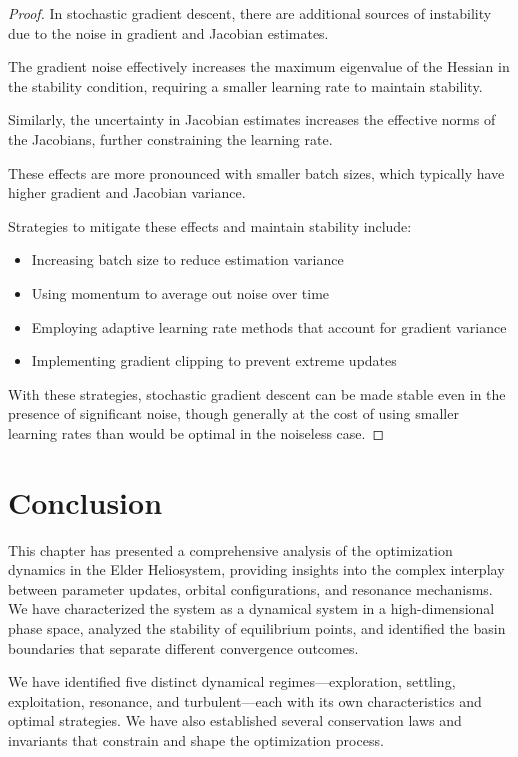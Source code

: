 \begin{proof}
In stochastic gradient descent, there are additional sources of instability due to the noise in gradient and Jacobian estimates.

The gradient noise effectively increases the maximum eigenvalue of the Hessian in the stability condition, requiring a smaller learning rate to maintain stability.

Similarly, the uncertainty in Jacobian estimates increases the effective norms of the Jacobians, further constraining the learning rate.

These effects are more pronounced with smaller batch sizes, which typically have higher gradient and Jacobian variance.

Strategies to mitigate these effects and maintain stability include:
\begin{itemize}
    \item Increasing batch size to reduce estimation variance
    \item Using momentum to average out noise over time
    \item Employing adaptive learning rate methods that account for gradient variance
    \item Implementing gradient clipping to prevent extreme updates
\end{itemize}

With these strategies, stochastic gradient descent can be made stable even in the presence of significant noise, though generally at the cost of using smaller learning rates than would be optimal in the noiseless case.
\end{proof}

\section{Conclusion}

This chapter has presented a comprehensive analysis of the optimization dynamics in the Elder Heliosystem, providing insights into the complex interplay between parameter updates, orbital configurations, and resonance mechanisms. We have characterized the system as a dynamical system in a high-dimensional phase space, analyzed the stability of equilibrium points, and identified the basin boundaries that separate different convergence outcomes.

We have identified five distinct dynamical regimes—exploration, settling, exploitation, resonance, and turbulent—each with its own characteristics and optimal strategies. We have also established several conservation laws and invariants that constrain and shape the optimization process.

